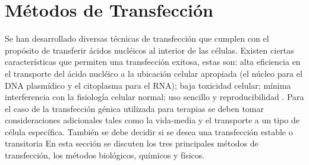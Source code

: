 \documentclass[fleqn,10pt]{SelfArx} %
\begin{document}
\section{Métodos de Transfección}
Se han desarrollado diversas técnicas de transfección que cumplen con el propósito de transferir ácidos nucléicos al interior de las células. Existen ciertas características que permiten una transfección exitosa, estas son: alta eficiencia en el transporte del ácido nucléico a la ubicación celular apropiada (el núcleo para el DNA plasmídico y el citoplasma para el RNA); baja toxicidad celular; mínima interferencia con la fisiología celular normal; uso sencillo y reproducibilidad \cite{Schenborn}. Para el caso de la transfección génica utilizada para terapias se deben tomar consideraciones adicionales tales como la vida-media y el transporte a un tipo de célula específica. También se debe decidir si se desea una transfección estable o transitoria  En esta sección se discuten los tres principales métodos de transfección, los métodos biológicos, químicos y físicos.
%
%
\end{document}
